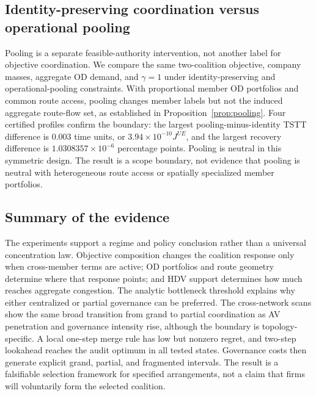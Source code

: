 \subsection{Identity-preserving coordination versus operational pooling}

Pooling is a separate feasible-authority intervention, not another label for objective coordination. We compare the same two-coalition objective, company masses, aggregate OD demand, and $\gamma=1$ under identity-preserving and operational-pooling constraints. With proportional member OD portfolios and common route access, pooling changes member labels but not the induced aggregate route-flow set, as established in Proposition~\ref{prop:pooling}. Four certified profiles confirm the boundary: the largest pooling-minus-identity TSTT difference is $0.003$ time units, or $3.94\times10^{-10}J^{UE}$, and the largest recovery difference is $1.0308357\times10^{-6}$ percentage points. Pooling is neutral in this symmetric design. The result is a scope boundary, not evidence that pooling is neutral with heterogeneous route access or spatially specialized member portfolios.

\subsection{Summary of the evidence}

The experiments support a regime and policy conclusion rather than a universal
concentration law. Objective composition changes the coalition response only
when cross-member terms are active; OD portfolios and route geometry determine
where that response points; and HDV support determines how much reaches
aggregate congestion. The analytic bottleneck threshold explains why either
centralized or partial governance can be preferred. The cross-network scans
show the same broad transition from grand to partial coordination as AV
penetration and governance intensity rise, although the boundary is
topology-specific. A local one-step merge rule has low but nonzero regret, and
two-step lookahead reaches the audit optimum in all tested states. Governance
costs then generate explicit grand, partial, and fragmented intervals. The
result is a falsifiable selection framework for specified arrangements, not a
claim that firms will voluntarily form the selected coalition.
